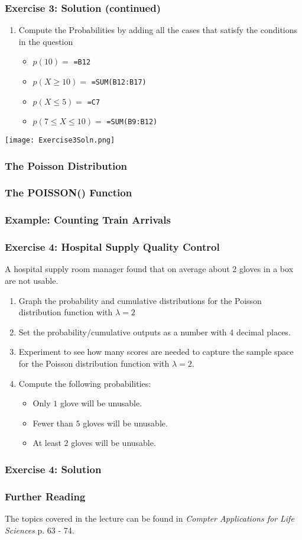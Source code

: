 \documentclass[12pt]{beamer}
\begin{document}
	\begin{frame}
		\frametitle{Exercise 3: Solution (continued)}
		\begin{enumerate}
			\item Compute the Probabilities by adding all the cases that satisfy the conditions in the question
			\begin{itemize}
				\item $p(10) = $ \texttt{=B12}
				\item $p(X \geq 10) =$ \texttt{=SUM(B12:B17)}
				\item $p(X \leq 5)= $ \texttt{=C7}
				\item $p(7\leq X\leq 10)=$ \texttt{=SUM(B9:B12)}
			\end{itemize}
		\end{enumerate}
	\begin{center}
		\texttt{[image: Exercise3Soln.png]}
	\end{center}
	\end{frame}
 
	\begin{frame}
		\frametitle{The Poisson Distribution}
	\end{frame}
	\begin{frame}
		\frametitle{The POISSON() Function}
	\end{frame}
	\begin{frame}
		\frametitle{Example: Counting Train Arrivals}
	\end{frame}
	\begin{frame}
		\frametitle{Exercise 4: Hospital Supply Quality Control}
		A hospital supply room manager found that on average about 2 gloves in a box are not usable.
		 
		\begin{enumerate}
			\item Graph the probability and cumulative distributions for the Poisson distribution function with $\lambda = 2$ 
			\item Set the probability/cumulative outputs as a number with 4 decimal places.
			\item Experiment to see how many scores are needed to capture the sample space for the Poisson distribution function with $\lambda=2$. 
			\item Compute the following probabilities:
				\begin{itemize}
					\item Only $1$ glove will be unusable.
					\item Fewer than $5$ gloves will be unusable.
					\item At least $2$ gloves will be unusable.
				\end{itemize}
		\end{enumerate}
	\end{frame}
	\begin{frame}
		\frametitle{Exercise 4: Solution}
	\end{frame}
	\begin{frame}
		\frametitle{Further Reading}
		The topics covered in the lecture can be found in \textit{Compter Applications for Life Sciences} p. 63 - 74.
	\end{frame}
\end{document}
